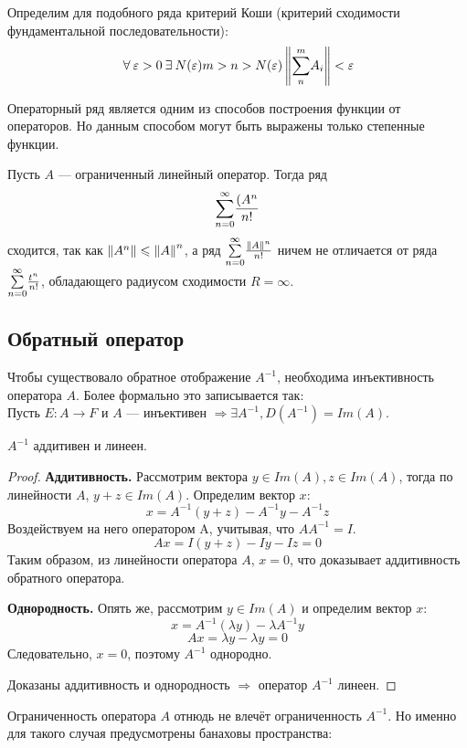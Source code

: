 	Определим для подобного ряда критерий Коши (критерий сходимости фундаментальной последовательности):
	$$\forall \varepsilon > 0 \exists N(\varepsilon) m > n > N(\varepsilon) \norm{ \Sum{n}{m} A_i } < \varepsilon$$
	
	Операторный ряд является одним из способов построения функции от операторов. Но данным способом могут быть выражены только степенные
	функции.
	
	\example Пусть $A$ --- ограниченный линейный оператор. Тогда ряд 
	$$\underset{n = 0}{\overset{\infty}{\sum}} \frac{(A^n}{n!}$$
	сходится, так как $\left\| A^n \right\| \leqslant \left\| A \right\|^n$, а ряд $\underset{n=0}{\overset{\infty}{\sum}} \frac{\left\| A \right\|^n}{n!}$ ничем не отличается от ряда
	$\underset{n=0}{\overset{\infty}{\sum}} \frac{t^n}{n!}$, обладающего радиусом сходимости $R = \infty$.
	
	\subsection{Обратный оператор}
	
	Чтобы существовало обратное отображение $A^{-1}$, необходима инъективность оператора $A$. Более формально это записывается так: \\
	Пусть $E : A \rightarrow F$ и $A$ --- инъективен $\Rightarrow \exists A^{-1}, D(A^{-1}) = Im(A)$.
	
	\begin{state}
		$A^{-1}$ аддитивен и линеен.
	\end{state}
	\begin{proof}
		\textbf{Аддитивность.} Рассмотрим вектора $y \in Im(A), z \in Im(A)$, тогда по линейности $A$, $y + z \in Im(A)$.
		Определим вектор $x$:
		$$x = A^{-1}(y + z) - A^{-1} y - A^{-1} z$$
		Воздействуем на него оператором A, учитывая, что $A A^{-1} = I$.
		$$Ax = I(y + z) - I y - I z = 0$$
		Таким образом, из линейности оператора $A$, $x = 0$, что доказывает аддитивность обратного оператора.
		
		\textbf{Однородность.} Опять же, рассмотрим $y \in Im(A)$ и определим вектор $x$:
		$$ x = A^{-1}(\lambda y) - \lambda A^{-1} y $$
		$$ Ax = \lambda y - \lambda y = 0 $$
		Следовательно, $x = 0$, поэтому $A^{-1}$ однородно.
		
		Доказаны аддитивность и однородность $\Rightarrow$ оператор $A^{-1}$ линеен.
	\end{proof}
	
	Ограниченность оператора $A$ отнюдь не влечёт ограниченность $A^{-1}$. Но именно для такого случая предусмотрены банаховы 
	пространства:
	
